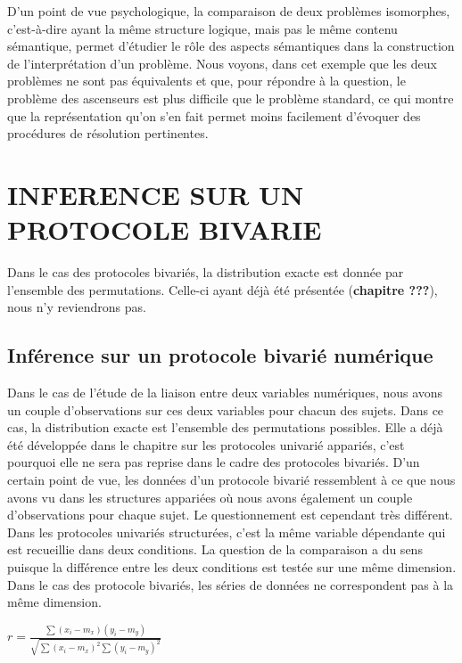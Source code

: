 \documentclass[]{book}
\theoremstyle{definition}
\theoremstyle{definition}
\theoremstyle{definition}
\theoremstyle{remark}
\begin{document}
D'un point de vue psychologique, la comparaison de deux problèmes
isomorphes, c'est-à-dire ayant la même structure logique, mais pas le
même contenu sémantique, permet d'étudier le rôle des aspects
sémantiques dans la construction de l'interprétation d'un problème. Nous
voyons, dans cet exemple que les deux problèmes ne sont pas équivalents
et que, pour répondre à la question, le problème des ascenseurs est plus
difficile que le problème standard, ce qui montre que la représentation
qu'on s'en fait permet moins facilement d'évoquer des procédures de
résolution pertinentes.

\hypertarget{inference-sur-un-protocole-bivarie}{%
\chapter{INFERENCE SUR UN PROTOCOLE
BIVARIE}\label{inference-sur-un-protocole-bivarie}}

Dans le cas des protocoles bivariés, la distribution exacte est donnée
par l'ensemble des permutations. Celle-ci ayant déjà été présentée
(\textbf{chapitre ???}), nous n'y reviendrons pas.

\hypertarget{inference-sur-un-protocole-bivarie-numerique}{%
\section{Inférence sur un protocole bivarié
numérique}\label{inference-sur-un-protocole-bivarie-numerique}}

Dans le cas de l'étude de la liaison entre deux variables numériques,
nous avons un couple d'observations sur ces deux variables pour chacun
des sujets. Dans ce cas, la distribution exacte est l'ensemble des
permutations possibles. Elle a déjà été développée dans le chapitre sur
les protocoles univarié appariés, c'est pourquoi elle ne sera pas
reprise dans le cadre des protocoles bivariés. D'un certain point de
vue, les données d'un protocole bivarié ressemblent à ce que nous avons
vu dans les structures appariées où nous avons également un couple
d'observations pour chaque sujet. Le questionnement est cependant très
différent. Dans les protocoles univariés structurées, c'est la même
variable dépendante qui est recueillie dans deux conditions. La question
de la comparaison a du sens puisque la différence entre les deux
conditions est testée sur une même dimension. Dans le cas des protocole
bivariés, les séries de données ne correspondent pas à la même
dimension.

\(r = \frac{\sum (x_{i}-m_{x})(y_{i}-m_{y})}{\sqrt{\sum (x_{i}-m_{x})^{2}\sum (y_{i}-m_{y})^{2}}}\)
\end{document}
